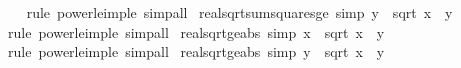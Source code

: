 \begin{isabellebody}
%
\isadelimproof
\ \ %
\endisadelimproof
%
\isatagproof
{}\isamarkupfalse%
\ {\isacharparenleft}{\kern0pt}rule\ power{}{\isacharunderscore}{\kern0pt}le{\isacharunderscore}{\kern0pt}imp{\isacharunderscore}{\kern0pt}le{\isacharparenright}{\kern0pt}\ simp{\isacharunderscore}{\kern0pt}all%
\endisatagproof
{\isafoldproof}%
%
\isadelimproof
\isanewline
%
\endisadelimproof
\isanewline
{}\isamarkupfalse%
\ real{\isacharunderscore}{\kern0pt}sqrt{\isacharunderscore}{\kern0pt}sum{\isacharunderscore}{\kern0pt}squares{\isacharunderscore}{\kern0pt}ge{}\ {\isacharbrackleft}{\kern0pt}simp{\isacharbrackright}{\kern0pt}{\isacharcolon}{\kern0pt}\ {\isachardoublequoteopen}y\ {\isasymle}\ sqrt\ {\isacharparenleft}{\kern0pt}x\ {\isacharplus}{\kern0pt}\ y\isanewline
%
\isadelimproof
\ \ %
\endisadelimproof
%
\isatagproof
{}\isamarkupfalse%
\ {\isacharparenleft}{\kern0pt}rule\ power{}{\isacharunderscore}{\kern0pt}le{\isacharunderscore}{\kern0pt}imp{\isacharunderscore}{\kern0pt}le{\isacharparenright}{\kern0pt}\ simp{\isacharunderscore}{\kern0pt}all%
\endisatagproof
{\isafoldproof}%
%
\isadelimproof
\isanewline
%
\endisadelimproof
\isanewline
{}\isamarkupfalse%
\ real{\isacharunderscore}{\kern0pt}sqrt{\isacharunderscore}{\kern0pt}ge{\isacharunderscore}{\kern0pt}abs{}\ {\isacharbrackleft}{\kern0pt}simp{\isacharbrackright}{\kern0pt}{\isacharcolon}{\kern0pt}\ {\isachardoublequoteopen}{\isasymbar}x{\isasymbar}\ {\isasymle}\ sqrt\ {\isacharparenleft}{\kern0pt}x\ {\isacharplus}{\kern0pt}\ y\isanewline
%
\isadelimproof
\ \ %
\endisadelimproof
%
\isatagproof
{}\isamarkupfalse%
\ {\isacharparenleft}{\kern0pt}rule\ power{}{\isacharunderscore}{\kern0pt}le{\isacharunderscore}{\kern0pt}imp{\isacharunderscore}{\kern0pt}le{\isacharparenright}{\kern0pt}\ simp{\isacharunderscore}{\kern0pt}all%
\endisatagproof
{\isafoldproof}%
%
\isadelimproof
\isanewline
%
\endisadelimproof
\isanewline
{}\isamarkupfalse%
\ real{\isacharunderscore}{\kern0pt}sqrt{\isacharunderscore}{\kern0pt}ge{\isacharunderscore}{\kern0pt}abs{}\ {\isacharbrackleft}{\kern0pt}simp{\isacharbrackright}{\kern0pt}{\isacharcolon}{\kern0pt}\ {\isachardoublequoteopen}{\isasymbar}y{\isasymbar}\ {\isasymle}\ sqrt\ {\isacharparenleft}{\kern0pt}x\ {\isacharplus}{\kern0pt}\ y\isanewline

\end{isabellebody}
